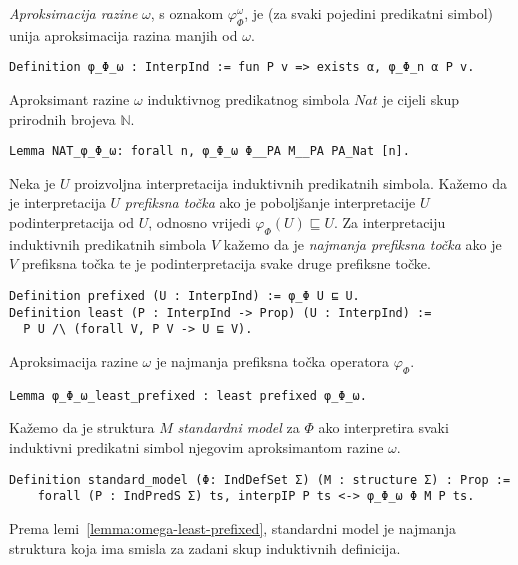 \begin{definition}
  \textit{Aproksimacija razine} \(\omega\), s oznakom \(\varphi_{\Phi}^{\omega}\), je (za svaki pojedini predikatni simbol)
  unija aproksimacija razina manjih od \(\omega\).
\begin{verbatim}
Definition φ_Φ_ω : InterpInd := fun P v => exists α, φ_Φ_n α P v.
\end{verbatim}
\end{definition}

\begin{example}
  Aproksimant razine \(\omega\) induktivnog predikatnog simbola \(\mathit{Nat}\)
  je cijeli skup prirodnih brojeva \(\mathbb{N}\).
\begin{verbatim}
Lemma NAT_φ_Φ_ω: forall n, φ_Φ_ω Φ__PA M__PA PA_Nat [n].
\end{verbatim}
\end{example}

\begin{definition}
  Neka je \(U\) proizvoljna interpretacija induktivnih predikatnih simbola.
  Kažemo da je interpretacija \(U\) \textit{prefiksna točka} ako
  je poboljšanje interpretacije \(U\) podinterpretacija od \(U\),
  odnosno vrijedi \(\varphi_{\Phi}(U) \sqsubseteq U\).
  Za interpretaciju induktivnih predikatnih simbola \(V\) kažemo da je
  \textit{najmanja prefiksna točka} ako je \(V\) prefiksna točka 
  te je podinterpretacija svake druge prefiksne točke.
\begin{verbatim}
Definition prefixed (U : InterpInd) := φ_Φ U ⊑ U.
Definition least (P : InterpInd -> Prop) (U : InterpInd) :=
  P U /\ (forall V, P V -> U ⊑ V).
\end{verbatim}
\end{definition}

\begin{lemma}\label{lemma:omega-least-prefixed}
  Aproksimacija razine \(\omega\) je najmanja prefiksna točka operatora \(\varphi_{\Phi}\).
\begin{verbatim}
Lemma φ_Φ_ω_least_prefixed : least prefixed φ_Φ_ω.
\end{verbatim}
\end{lemma}

\begin{definition}
  Kažemo da je struktura \(M\) \textit{standardni model} za \(\Phi\) ako
  interpretira svaki induktivni predikatni simbol njegovim aproksimantom razine \(\omega\).
\begin{verbatim}
Definition standard_model (Φ: IndDefSet Σ) (M : structure Σ) : Prop :=
    forall (P : IndPredS Σ) ts, interpIP P ts <-> φ_Φ_ω Φ M P ts.
\end{verbatim}
\end{definition}
\noindent Prema lemi~\ref{lemma:omega-least-prefixed}, standardni model je
najmanja struktura koja ima smisla za zadani skup induktivnih definicija.

